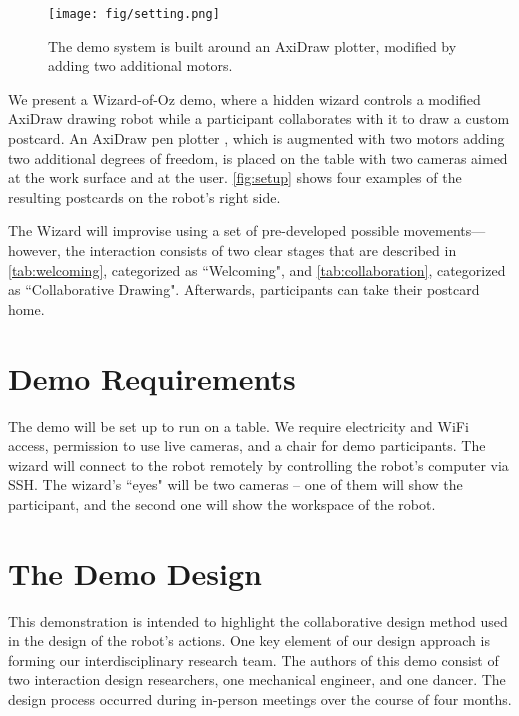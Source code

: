 \documentclass[sigconf,anonymous=false]{acmart}
\begin{document}
\begin{figure}%
\centerline{\texttt{[image: fig/setting.png]}}
\caption{The demo system is built around an AxiDraw plotter, modified by adding two additional motors.}
\label{fig:setup}
\end{figure}


We present a Wizard-of-Oz demo, where a hidden wizard controls a modified AxiDraw drawing robot while a participant collaborates with it to draw a custom postcard. An AxiDraw pen plotter \cite{scientist_axidraw_2022}, which is augmented with two motors adding two additional degrees of freedom, is placed on the table with two cameras aimed at the work surface and at the user. \autoref{fig:setup} shows four examples of the resulting postcards on the robot's right side. 

The Wizard will improvise using a set of pre-developed possible movements---however, the interaction consists of two clear stages that are described in \autoref{tab:welcoming}, categorized as ``Welcoming", and \autoref{tab:collaboration}, categorized as ``Collaborative Drawing". Afterwards, participants can take their postcard home.

\section{Demo Requirements}
The demo will be set up to run on a table. We require electricity and WiFi access, permission to use live cameras, and a chair for demo participants. The wizard will connect to the robot remotely by controlling the robot's computer via SSH. The wizard's ``eyes" will be two cameras -- one of them will show the participant, and the second one will show the workspace of the robot. 



\section{The Demo Design}
This demonstration is intended to highlight the collaborative design method used in the design of the robot's actions. One key element of our design approach is forming our interdisciplinary research team. The authors of this demo consist of two interaction design researchers, one mechanical engineer, and one dancer. The design process occurred during in-person meetings over the course of four months. 
\end{document}
